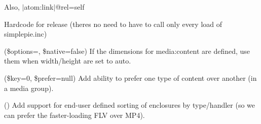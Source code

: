 \begin{DoxyRefList}
Also, \texorpdfstring{$\vert$}{|}atom\+:link\texorpdfstring{$\vert$}{|}@rel=self  
\item[\doxylink{report_8contract_8php_a77b973d137fb33212e018b042df6e3e7}{Global(e)} \doxylink{_simple_pie_8php_aa07226af0bfdcb06c21a4464624a08d2}{SIMPLEPIE\+\_\+\+BUILD} ]\label{todo__todo000037}%
%
Hardcode for release (there\textquotesingle{}s no need to have to call  only every load of simplepie.\+inc)  
\item[\doxylink{report_8contract_8php_a77b973d137fb33212e018b042df6e3e7}{Global(e)} \doxylink{class_simple_pie___enclosure_acb1c6c5b7e7bb03e4fdc24085c15509a}{Simple\+Pie\+\_\+\+Enclosure\+::embed} (\$options=\textquotesingle{}\textquotesingle{}, \$native=false)]\label{todo__todo000039}%
%
If the dimensions for media\+:content are defined, use them when width/height are set to \textquotesingle{}auto\textquotesingle{}.  
\item[\doxylink{report_8contract_8php_a77b973d137fb33212e018b042df6e3e7}{Global(e)} \doxylink{class_simple_pie___item_aa33a975d8bab85bde5aed303b1060a51}{Simple\+Pie\+\_\+\+Item\+::get\+\_\+enclosure} (\$key=0, \$prefer=null)]\label{todo__todo000041}%
%
Add ability to prefer one type of content over another (in a media group).  
\item[\doxylink{report_8contract_8php_a77b973d137fb33212e018b042df6e3e7}{Global(e)} \doxylink{class_simple_pie___item_ae5495772db7c995587c2d6ebbe2f185c}{Simple\+Pie\+\_\+\+Item\+::get\+\_\+enclosures} ()]\label{todo__todo000042}%
%
Add support for end-\/user defined sorting of enclosures by type/handler (so we can prefer the faster-\/loading FLV over MP4). 




\end{DoxyRefList}
